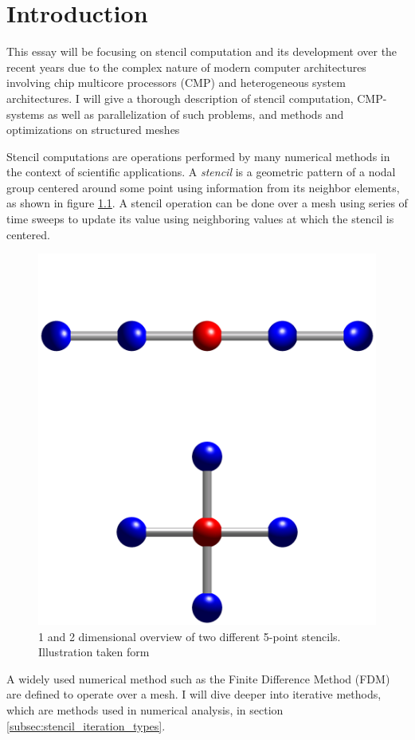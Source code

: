 \chapter{Introduction} 
This essay will be focusing on stencil computation and its development over the recent years due to the complex nature of modern computer architectures involving chip multicore processors (CMP) and heterogeneous system architectures. I will give a thorough description of stencil computation, CMP-systems as well as parallelization of such problems, and methods and optimizations on structured meshes

Stencil computations are operations performed by many numerical methods in the context of scientific  applications. A \textit{stencil} is a geometric pattern of a nodal group centered around some point using information from its neighbor elements, as shown in figure \ref{I_Five_point_stencil_illustration.png}. A stencil operation can be done over a mesh using series of time sweeps to update its value using neighboring values at which the stencil is centered.
\begin{figure}[h]
 \centering 
     \includegraphics[height=0.5\textwidth]{bilder/I_Five_point_stencil_illustration}
     \caption{1 and 2 dimensional overview of two different 5-point stencils. Illustration taken form \cite{pic1}
     \label{I_Five_point_stencil_illustration.png}}
\end{figure}
A widely used numerical method such as the Finite Difference Method (FDM) are defined to operate over a mesh. I will dive deeper into iterative methods, which are methods used in numerical analysis, in section \ref{subsec:stencil_iteration_types}. 

